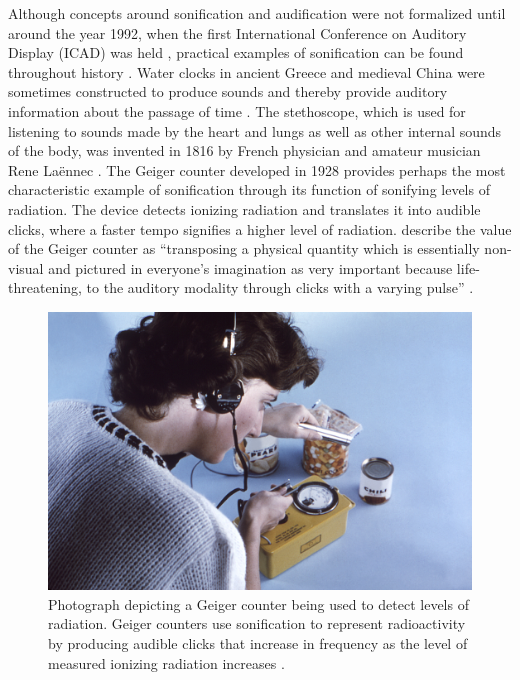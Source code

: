 \documentclass[10pt,a4paper,onecolumn]{article}
\begin{document}
Although concepts around sonification and audification were not formalized until around the year 1992, when the first International Conference on Auditory Display (ICAD) was held \autocite{dubusSonificationPhysicalQuantities2011}, practical examples of sonification can be found throughout history \autocite{dubusInteractiveSonificationMotion2013}. Water clocks in ancient Greece and medieval China were sometimes constructed to produce sounds and thereby provide auditory information about the passage of time \autocite{dubusSonificationPhysicalQuantities2011}. The stethoscope, which is used for listening to sounds made by the heart and lungs as well as other internal sounds of the body, was invented in 1816 by French physician and amateur musician Rene Laënnec \autocite{roguinReneTheophileHyacinthe2006}. The Geiger counter developed in 1928 provides perhaps the most characteristic example of sonification through its function of sonifying levels of radiation. The device detects ionizing radiation and translates it into audible clicks, where a faster tempo signifies a higher level of radiation. \textcite{dubusSonificationPhysicalQuantities2011} describe the value of the Geiger counter as ``transposing a physical quantity which is essentially non-visual and pictured in everyone's imagination as very important because life-threatening, to the auditory modality through clicks with a varying pulse'' \autocite[p.~1]{dubusSonificationPhysicalQuantities2011}.



\begin{figure}[h]

{\centering \includegraphics[width=1\linewidth]{figures/Geiger_counter_usage} 

}

\caption{Photograph depicting a Geiger counter being used to detect levels of radiation. Geiger counters use sonification to represent radioactivity by producing audible clicks that increase in frequency as the level of measured ionizing radiation increases \autocite{dobsonDetailsPublicHealth1963}.}\label{fig:geiger-counter}
\end{figure}
\end{document}
